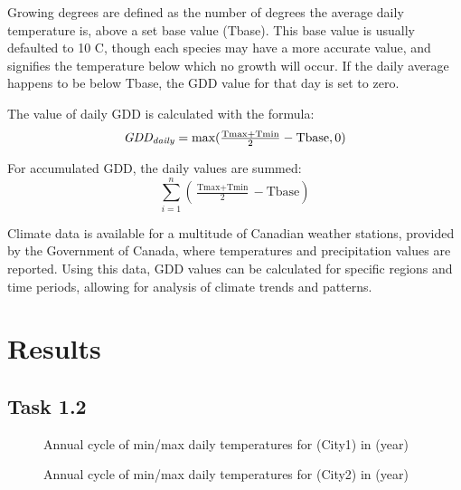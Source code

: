 \documentclass[12pt]{article}
\begin{document}
Growing degrees are defined as the number of degrees the average daily 
temperature is, above a set base value (Tbase). This base value is 
usually defaulted to 10 \degree C, though each species may have a more 
accurate value, and signifies the temperature below which no growth 
will occur. If the daily average happens to be below Tbase, the GDD 
value for that day is set to zero. \\

\bigskip
\par

The value of daily GDD is calculated with the formula:
$$
\textit{GDD\textsubscript{daily}} =  \text{max}( \tfrac{\text{Tmax}+\text{Tmin}}{2}-\text{Tbase}, 0)
$$

\bigskip
\bigskip

For accumulated GDD, the daily values are summed:
$$
\sum_{i=1}^n ( \tfrac{\text{Tmax}+\text{Tmin}}{2}-\text{Tbase})
$$

\bigskip

\par
Climate data is available for a multitude of Canadian weather stations, provided
by the Government of Canada, where temperatures and precipitation values are reported. 
Using this data, GDD values can be calculated for 
specific regions and time periods, allowing for analysis of climate trends and patterns. 



\pagebreak

\section{Results}\label{data analysis}
\subsection{Task 1.2}

\begin{figure}[!htbp]
\centering
\caption{\scriptsize Annual cycle of min/max daily temperatures for (City1) in (year)}
\label{minmax1}		  
\end{figure}

\begin{figure}[!htbp]
\centering
\caption{\scriptsize Annual cycle of min/max daily temperatures for (City2) in (year)}
\label{minmax2}		  
\end{figure}
\end{document}
